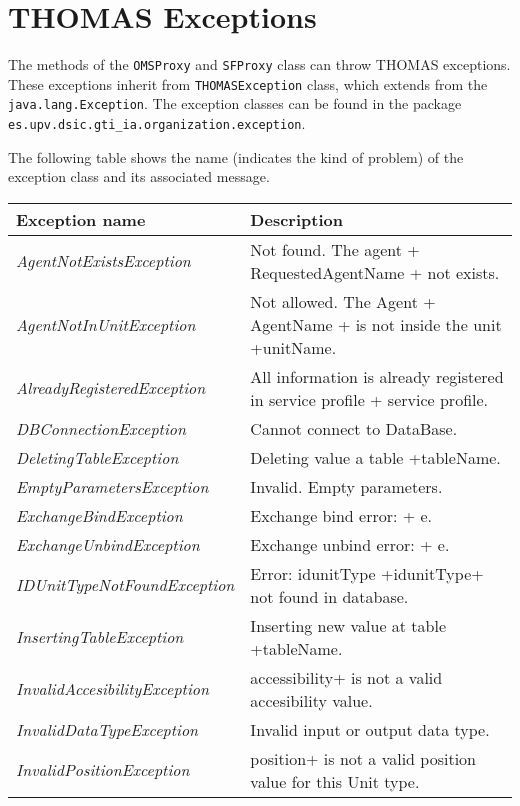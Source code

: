 \chapter{THOMAS Exceptions}\label{app:Exceptions}

The methods of the \lstinline|OMSProxy| and \lstinline|SFProxy| class can throw THOMAS exceptions. These exceptions inherit from \lstinline|THOMASException| class, which extends from the \lstinline|java.lang.Exception|. The exception classes can be found in the package \lstinline|es.upv.dsic.gti_ia.organization.exception|.


The following table shows the name (indicates the kind of problem) of the exception class and its associated message.

\begin{longtable}{|p{6.5cm}|p{7.2cm}|}
\hline
  \textbf{Exception name} & \textbf{Description} \\ \endhead \hline
  \emph{AgentNotExistsException} & Not found. The agent + RequestedAgentName +  not exists. \\ \hline
  \emph{AgentNotInUnitException} & Not allowed. The Agent + AgentName +  is not inside the unit +unitName. \\ \hline
  \emph{AlreadyRegisteredException} & All information is already registered in service profile + service profile. \\ \hline
  \emph{DBConnectionException} & Cannot connect to DataBase. \\ \hline
  \emph{DeletingTableException} & Deleting value a table +tableName. \\ \hline
  \emph{EmptyParametersException} & Invalid. Empty parameters. \\ \hline
  \emph{ExchangeBindException} & Exchange bind error: + e. \\ \hline
  \emph{ExchangeUnbindException} & Exchange unbind error: + e. \\ \hline
  \emph{IDUnitTypeNotFoundException} & Error: idunitType +idunitType+ not found in database. \\ \hline
  \emph{InsertingTableException} & Inserting new value at table +tableName. \\ \hline
  \emph{InvalidAccesibilityException} & accessibility+ is not a valid accesibility value. \\ \hline
  \emph{InvalidDataTypeException} & Invalid input or output data type. \\ \hline
  \emph{InvalidPositionException} & position+ is not a valid position value for this Unit type. \\ \hline

\end{longtable}
